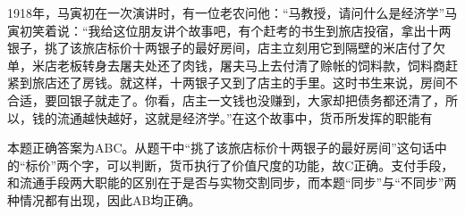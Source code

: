 \question 1918年，马寅初在一次演讲时，有一位老农问他：``马教授，请问什么是经济学''马寅初笑着说：``我给这位朋友讲个故事吧，有个赶考的书生到旅店投宿，拿出十两银子，挑了该旅店标价十两银子的最好房间，店主立刻用它到隔壁的米店付了欠单，米店老板转身去屠夫处还了肉钱，屠夫马上去付清了赊帐的饲料款，饲料商赶紧到旅店还了房钱。就这样，十两银子又到了店主的手里。这时书生来说，房间不合适，要回银子就走了。你看，店主一文钱也没赚到，大家却把债务都还清了，所以，钱的流通越快越好，这就是经济学。''在这个故事中，货币所发挥的职能有
\par{}
\begin{solution}本题正确答案为ABC。从题干中``挑了该旅店标价十两银子的最好房间''这句话中的``标价''两个字，可以判断，货币执行了价值尺度的功能，故C正确。支付手段，和流通手段两大职能的区别在于是否与实物交割同步，而本题``同步''与``不同步''两种情况都有出现，因此AB均正确。
\end{solution}

